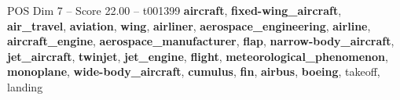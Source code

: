 \begin{textsample}{POS Dim 7 – Score 22.00 – t001399}  \label{ex:f7_pos_015}
\textbf{aircraft}, \textbf{fixed-wing\_aircraft}, \textbf{air\_travel}, \textbf{aviation}, \textbf{wing}, \textbf{airliner}, \textbf{aerospace\_engineering}, \textbf{airline}, \textbf{aircraft\_engine}, \textbf{aerospace\_manufacturer}, \textbf{flap}, \textbf{narrow-body\_aircraft}, \textbf{jet\_aircraft}, \textbf{twinjet}, \textbf{jet\_engine}, \textbf{flight}, \textbf{meteorological\_phenomenon}, \textbf{monoplane}, \textbf{wide-body\_aircraft}, \textbf{cumulus}, \textbf{fin}, \textbf{airbus}, \textbf{boeing}, takeoff, landing

\end{textsample}
